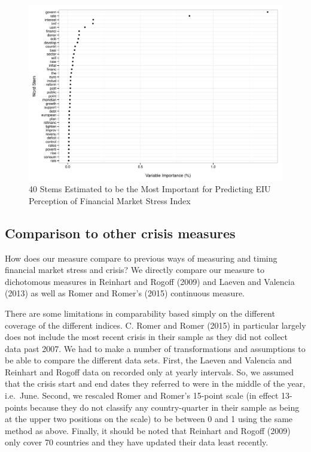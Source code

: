\documentclass[]{article}
\begin{document}
\begin{figure}
    \caption{40 Stems Estimated to be the Most Important for Predicting EIU Perception of Financial Market Stress Index}
    \label{rf_importance}

    \begin{center}
        \includegraphics[scale=0.5]{analysis/figures/rf_stem_importance.pdf}
    \end{center}

\end{figure}

\subsection{Comparison to other crisis
measures}\label{comparison-to-other-crisis-measures}

How does our measure compare to previous ways of measuring and timing
financial market stress and crisis? We directly compare our measure to
dichotomous measures in Reinhart and Rogoff (2009) and Laeven and
Valencia (2013) as well as Romer and Romer's (2015) continuous measure.

There are some limitations in comparability based simply on the
different coverage of the different indices. C. Romer and Romer (2015)
in particular largely does not include the most recent crisis in their
sample as they did not collect data past 2007. We had to make a number
of transformations and assumptions to be able to compare the different
data sets. First, the Laeven and Valencia and Reinhart and Rogoff data
on recorded only at yearly intervals. So, we assumed that the crisis
start and end dates they referred to were in the middle of the year,
i.e.~June. Second, we rescaled Romer and Romer's 15-point scale (in
effect 13-points because they do not classify any country-quarter in
their sample as being at the upper two positions on the scale) to be
between 0 and 1 using the same method as above. Finally, it should be
noted that Reinhart and Rogoff (2009) only cover 70 countries and they
have updated their data least recently.
\end{document}
